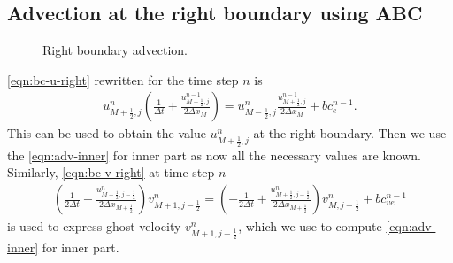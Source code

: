 \documentclass{article}
\numberwithin{equation}{section}
\begin{document}
\pagebreak
\subsection{Advection at the right boundary using ABC}\label{subsec:advection-ABC}
\begin{figure}[H] %
  \caption{Right boundary advection.}\label{fig:ADV-right}
\end{figure}
\cref{eqn:bc-u-right} rewritten for the time step $n$ is
\begin{equation*}
\begin{gathered}
{{u}^{n}_{M+\frac{1}{2},j}}\left(\frac{1}{\Delta t} + \frac{u^{n-1}_{M+\frac{1}{2},j}}{2\Delta x_M}\right)
=
u^{n}_{M-\frac{1}{2},j}\frac{u^{n-1}_{M+\frac{1}{2},j}}{2\Delta x_M}+bc_e^{n-1}.
\end{gathered}
\end{equation*}
This can be used to obtain the value $u^{n}_{M+\frac{1}{2},j}$ at the right boundary. Then we use the \cref{eqn:adv-inner} for inner part as now all the necessary values are known. Similarly, \cref{eqn:bc-v-right} at time step $n$
\begin{equation*}
\begin{gathered}
\left( \frac{1}{2\Delta t} + \frac{u^n_{M+\frac{1}{2},j-\frac{1}{2}}}{2\Delta x_{M+\frac{1}{2}}}\right) v^{n}_{M+1,j-\frac{1}{2}}
=\left( -\frac{1}{2\Delta t}+\frac{u^n_{M+\frac{1}{2},j-\frac{1}{2}}}{2\Delta x_{M+\frac{1}{2}}} \right)v^{n}_{M,j-\frac{1}{2}}+bc_{ve}^{n-1}
\end{gathered}
\end{equation*}
is used to express ghost velocity $v^{n}_{M+1,j-\frac{1}{2}}$, which we use to compute \cref{eqn:adv-inner} for inner part.
\end{document}
